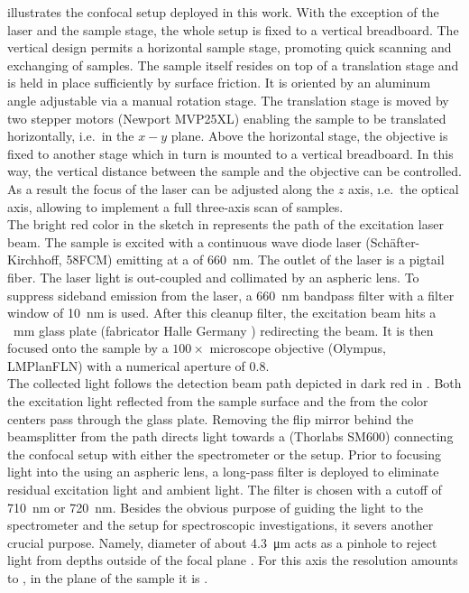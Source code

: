 		 illustrates the confocal setup deployed in this work.
		With the exception of the laser and the sample stage, the whole setup is fixed to a vertical breadboard.
		The vertical design permits a horizontal sample stage, promoting quick scanning and exchanging of samples.
		The sample itself resides on top of a translation stage and is held in place sufficiently by surface friction.
		It is oriented by an aluminum angle adjustable via a manual rotation stage.
		The translation stage is moved by two stepper motors (Newport MVP25XL) enabling the sample to be translated horizontally, i.e.\ in the $x-y$ plane.
		Above the horizontal stage, the objective is fixed to another stage which in turn is mounted to a vertical breadboard.
		In this way, the vertical distance between the sample and the objective can be controlled. As a result the focus of the laser can be adjusted along the $z$ axis, \i.e.\ the optical axis, allowing to implement a full three-axis scan of samples.
		\\
		The bright red color in the sketch in  represents the path of the excitation laser beam.
		The sample is excited with a continuous wave diode laser (Sch\"after-Kirchhoff, 58FCM) emitting at a \wl of \SI{660}{\nano\meter}.
		The outlet of the laser is a pigtail fiber.
		The laser light is out-coupled and collimated by an aspheric lens.
		To suppress sideband emission from the laser, a \SI{660}{\nm} bandpass filter with a filter window of \SI{10}{\nm} is used.
		After this cleanup filter, the excitation beam hits a \SI{}{\milli\meter} glass plate (fabricator Halle Germany ) redirecting the beam. It is then focused onto the sample by a $100 \times$ microscope objective (Olympus, LMPlanFLN) with a numerical aperture of $0.8$.
		\\
		The collected light follows the detection beam path depicted in dark red in .
		Both the excitation light reflected from the sample surface and the \fl from the color centers pass through the glass plate.
		Removing the flip mirror behind the beamsplitter from the path directs light towards a \smf (Thorlabs SM600) connecting the confocal setup with either the spectrometer or the \hbt setup. Prior to focusing light into the \smf using an aspheric lens, a long-pass filter is deployed to eliminate residual excitation light and ambient light.
		The filter is chosen with a cutoff \wl of \SI{710}{\nm} or \SI{720}{\nm}.
		Besides the obvious purpose of guiding the \pl light to the spectrometer and the \HBT setup for spectroscopic investigations, it severs another crucial purpose. Namely, diameter of about \SI{4.3}{\micro\meter} acts as a pinhole to reject \pl light from depths outside of the focal plane \cite{Santori2010}.
		For this axis the resolution amounts to , in the plane of the sample it is .

